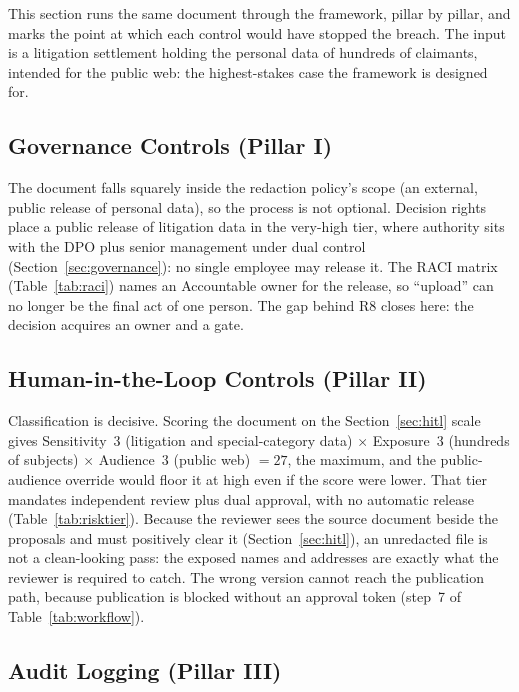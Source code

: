 \documentclass[12pt,a4paper]{article}
\begin{document}
This section runs the same document through the framework, pillar by pillar, and marks the point at which each control would have stopped the breach. The input is a litigation settlement holding the personal data of hundreds of claimants, intended for the public web: the highest-stakes case the framework is designed for.

\subsection{Governance Controls (Pillar I)}

The document falls squarely inside the redaction policy's scope (an external, public release of personal data), so the process is not optional. Decision rights place a public release of litigation data in the very-high tier, where authority sits with the DPO plus senior management under dual control (Section~\ref{sec:governance}): no single employee may release it. The RACI matrix (Table~\ref{tab:raci}) names an Accountable owner for the release, so ``upload'' can no longer be the final act of one person. The gap behind R8 closes here: the decision acquires an owner and a gate.

\subsection{Human-in-the-Loop Controls (Pillar II)}

Classification is decisive. Scoring the document on the Section~\ref{sec:hitl} scale gives Sensitivity~$3$ (litigation and special-category data) $\times$ Exposure~$3$ (hundreds of subjects) $\times$ Audience~$3$ (public web) $=27$, the maximum, and the public-audience override would floor it at high even if the score were lower. That tier mandates independent review plus dual approval, with no automatic release (Table~\ref{tab:risktier}). Because the reviewer sees the source document beside the proposals and must positively clear it (Section~\ref{sec:hitl}), an unredacted file is not a clean-looking pass: the exposed names and addresses are exactly what the reviewer is required to catch. The wrong version cannot reach the publication path, because publication is blocked without an approval token (step~7 of Table~\ref{tab:workflow}).

\subsection{Audit Logging (Pillar III)}
\end{document}

